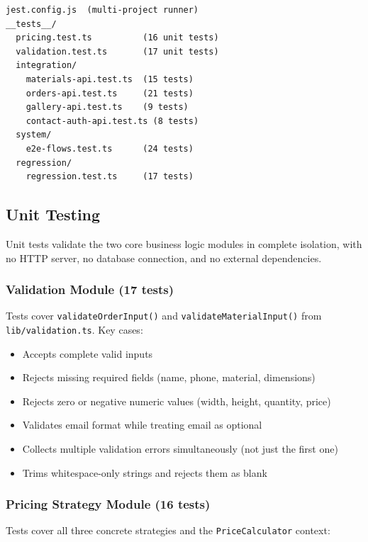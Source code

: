 \documentclass[12pt, a4paper]{article}
\begin{document}
\begin{lstlisting}[caption=Jest Multi-Project Directory Structure]
jest.config.js  (multi-project runner)
__tests__/
  pricing.test.ts          (16 unit tests)
  validation.test.ts       (17 unit tests)
  integration/
    materials-api.test.ts  (15 tests)
    orders-api.test.ts     (21 tests)
    gallery-api.test.ts    (9 tests)
    contact-auth-api.test.ts (8 tests)
  system/
    e2e-flows.test.ts      (24 tests)
  regression/
    regression.test.ts     (17 tests)
\end{lstlisting}

\subsection{Unit Testing}

Unit tests validate the two core business logic modules in complete isolation, with no HTTP server, no database connection, and no external dependencies.

\subsubsection{Validation Module (17 tests)}

Tests cover \texttt{validateOrderInput()} and \texttt{validateMaterialInput()} from \texttt{lib/validation.ts}. Key cases:

\begin{itemize}[noitemsep]
  \item Accepts complete valid inputs
  \item Rejects missing required fields (name, phone, material, dimensions)
  \item Rejects zero or negative numeric values (width, height, quantity, price)
  \item Validates email format while treating email as optional
  \item Collects multiple validation errors simultaneously (not just the first one)
  \item Trims whitespace-only strings and rejects them as blank
\end{itemize}

\subsubsection{Pricing Strategy Module (16 tests)}

Tests cover all three concrete strategies and the \texttt{PriceCalculator} context:
\end{document}
